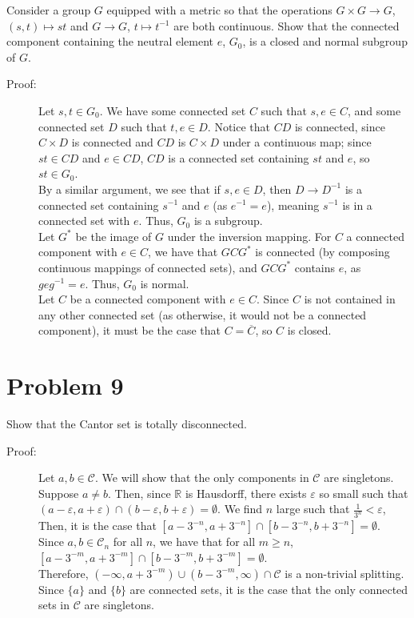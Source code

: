 \documentclass[8pt]{extarticle}
\newcommand{\R}{\mathbb{R}}
\begin{document}
  Consider a group $G$ equipped with a metric so that the operations $G\times G \rightarrow G$, $(s,t)\mapsto st$ and $G\rightarrow G$, $t\mapsto t^{-1}$ are both continuous. Show that the connected component containing the neutral element $e$, $G_0$, is a closed and normal subgroup of $G$.
  \begin{description}
    \item[Proof:] Let $s,t\in G_0$. We have some connected set $C$ such that $s,e\in C$, and some connected set $D$ such that $t,e\in D$. Notice that $CD$ is connected, since $C\times D$ is connected and $CD$ is $C\times D$ under a continuous map; since $st\in CD$ and $e\in CD$, $CD$ is a connected set containing $st$ and $e$, so $st\in G_0$.\\

      By a similar argument, we see that if $s,e\in D$, then $D\rightarrow D^{-1}$ is a connected set containing $s^{-1}$ and $e$ (as $e^{-1} = e$), meaning $s^{-1}$ is in a connected set with $e$. Thus, $G_0$ is a subgroup.\\

      Let $G^{\ast}$ be the image of $G$ under the inversion mapping. For $C$ a connected component with $e\in C$, we have that $GCG^{\ast}$ is connected (by composing continuous mappings of connected sets), and $GCG^{\ast}$ contains $e$, as $geg^{-1} = e$. Thus, $G_0$ is normal.\\

      Let $C$ be a connected component with $e\in C$. Since $C$ is not contained in any other connected set (as otherwise, it would not be a connected component), it must be the case that $C = \overline{C}$, so $C$ is closed.
  \end{description}
  \section{Problem 9}%
  Show that the Cantor set is totally disconnected.
  \begin{description}
    \item[Proof:] Let $a,b\in \mathcal{C}$. We will show that the only components in $\mathcal{C}$ are singletons.\\

      Suppose $a\neq b$. Then, since $\R$ is Hausdorff, there exists $\varepsilon$ so small such that $(a-\varepsilon,a+\varepsilon) \cap (b-\varepsilon,b+\varepsilon) = \emptyset$. We find $n$ large such that $\frac{1}{3^n} < \varepsilon$, Then, it is the case that $[a-3^{-n},a+3^{-n}] \cap [b-3^{-n},b+3^{-n}] = \emptyset$.\\

      Since $a,b\in \mathcal{C}_n$ for all $n$, we have that for all $m\geq n$, $[a-3^{-m},a+3^{-m}] \cap [b-3^{-m},b+3^{-m}] = \emptyset$.\\

      Therefore, $(-\infty,a+3^{-m}) \cup (b-3^{-m},\infty)\cap \mathcal{C}$ is a non-trivial splitting.\\

      Since $\{a\}$ and $\{b\}$ are connected sets, it is the case that the only connected sets in $\mathcal{C}$ are singletons.
  \end{description}
\end{document}

